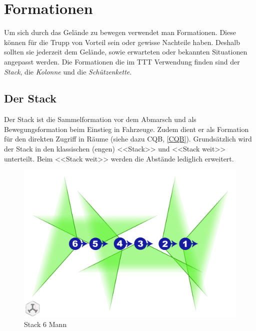\section{Formationen}
Um sich durch das Gelände zu bewegen verwendet man Formationen. Diese können für die Trupp von Vorteil sein oder gewisse Nachteile haben. Deshalb sollten sie jederzeit dem Gelände, sowie erwarteten oder bekannten Situationen angepasst werden. Die Formationen die im TTT Verwendung finden sind der \textit{Stack}, die \textit{Kolonne} und die \textit{Schützenkette}. 

\subsection{Der Stack}
Der Stack ist die Sammelformation vor dem Abmarsch und als Bewegungsformation beim Einstieg in Fahrzeuge. Zudem dient er als Formation für den direkten Zugriff in Räume (siehe dazu CQB, \autoref{CQB}). Grundsätzlich wird der Stack in den klassischen (engen) <<Stack>> und <<Stack weit>> unterteilt. Beim <<Stack weit>> werden die Abstände lediglich erweitert.
\begin{figure}[h]
	\centering
	\includegraphics[width=0.7\linewidth]{./img/basic/formation/stack_6mann}
	\caption{Stack 6 Mann}
\end{figure}\\

